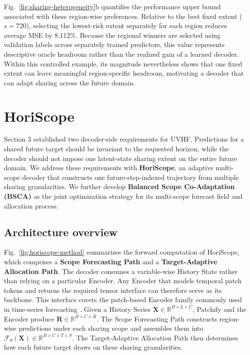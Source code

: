 \documentclass[final,3p,times]{elsarticle}
\begin{document}
Fig.~\ref{fig:sharing-heterogeneity}b quantifies the performance upper bound associated with these region-wise preferences. Relative to the best fixed extent ($s=720$), selecting the lowest-risk extent separately for each region reduces average MSE by 8.112\%. Because the regional winners are selected using validation labels across separately trained predictors, this value represents descriptive oracle headroom rather than the realized gain of a learned decoder. Within this controlled example, its magnitude nevertheless shows that one fixed extent can leave meaningful region-specific headroom, motivating a decoder that can adapt sharing across the future domain.

\section{HoriScope}
\label{sec:method}


Section 3 established two decoder-side requirements for UVHF. Predictions for a shared future target should be invariant to the requested horizon, while the decoder should not impose one latent-state sharing extent on the entire future domain. We address these requirements with \textbf{HoriScope}, an adaptive multi-scope decoder that constructs one future-step-indexed trajectory from multiple sharing granularities. We further develop \textbf{Balanced Scope Co-Adaptation (BSCA)} as the joint optimization strategy for its multi-scope forecast field and allocation process.

\subsection{Architecture overview}


Fig.~\ref{fig:horiscope-method} summarizes the forward computation of HoriScope, which comprises a \textbf{Scope Forecasting Path} and a \textbf{Target-Adaptive Allocation Path}. The decoder consumes a variable-wise History State rather than relying on a particular Encoder. Any Encoder that models temporal patch tokens and returns the required tensor interface can therefore serve as its backbone. This interface covers the patch-based Encoder family commonly used in time-series forecasting \citep{nie2023patchtst,zhang2023crossformer}. Given a History Series $\mathbf X\in\mathbb R^{B\times L\times C}$, Patchify and the Encoder produce $\mathbf R\in\mathbb R^{B\times C\times R}$. The Scope Forecasting Path constructs region-wise predictions under each sharing scope and assembles them into $\mathcal F_\theta(\mathbf X)\in\mathbb R^{B\times C\times T\times S}$. The Target-Adaptive Allocation Path then determines how each future target draws on these sharing granularities.
\end{document}
